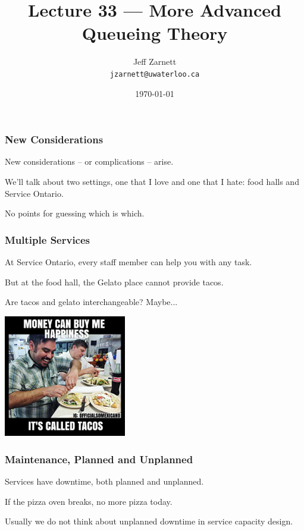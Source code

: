 

\title{Lecture 33 --- More Advanced Queueing Theory}

\author{Jeff Zarnett\\ \small \texttt{jzarnett@uwaterloo.ca}}
\date{\today}




\begin{frame}
  \titlepage

 \end{frame}


\begin{frame}
\frametitle{New Considerations}

New considerations -- or complications -- arise.

We'll talk about two settings, one that I love and one that I hate: food halls and Service Ontario. 
 
No points for guessing which is which.

\end{frame}


\begin{frame}
\frametitle{Multiple Services}

At Service Ontario, every staff member can help you with any task.

But at the food hall, the Gelato place cannot provide tacos.

Are tacos and gelato interchangeable? Maybe...

\begin{center}
	\includegraphics[width=0.4\textwidth]{images/tacos.jpg}
\end{center}

\end{frame}



\begin{frame}
\frametitle{Maintenance, Planned and Unplanned}

Services have downtime, both planned and unplanned.

If the pizza oven breaks, no more pizza today.

Usually we do not think about unplanned downtime in service capacity design.


\end{frame}


